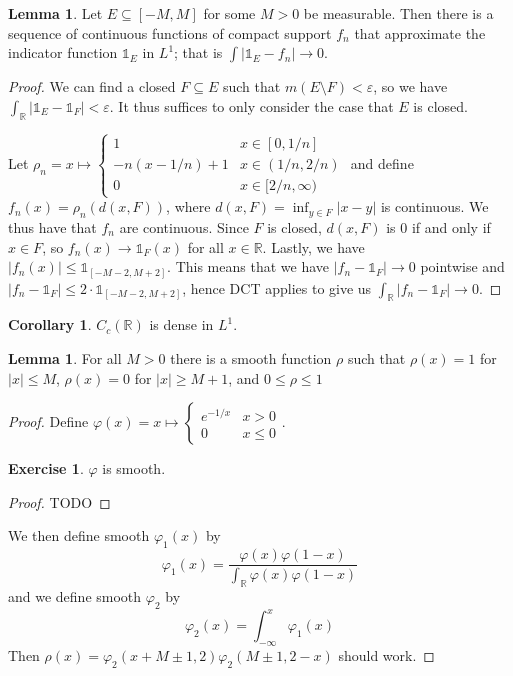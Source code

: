 \documentclass{article}
\newcommand{\R}{\mathbb{R}}
\theoremstyle{definition} %
\numberwithin{thm}{section} %
\newtheorem{lemma}[thm]{Lemma}
\newtheorem{cor}[thm]{Corollary}
\theoremstyle{definition} %
\newtheorem{exercise}[thm]{Exercise}
\begin{document}
\begin{lemma}
Let $E \subseteq [-M, M]$ for some $M > 0$ be measurable. Then there is a sequence of continuous functions of compact support $f_n$ that approximate the indicator function $\mathds{1}_E$ in $L^1$; that is $\int |\mathds{1}_E - f_n| \to 0$.
\end{lemma}

\begin{proof}
We can find a closed $F \subseteq E$ such that $m(E \setminus F) < \varepsilon$, so we have $\int_\R |\mathds{1}_E - \mathds{1}_F| < \varepsilon$. It thus suffices to only consider the case that $E$ is closed.

Let $\rho_n = x \mapsto \begin{cases}
    1 & x \in [0, 1/n] \\
    -n(x - 1/n) + 1 & x \in (1/n, 2/n) \\
    0 & x \in [2/n, \infty)
\end{cases}$ and define $f_n(x) = \rho_n(d(x, F))$, where $d(x, F) = \inf_{y \in F}|x - y|$ is continuous. We thus have that $f_n$ are continuous. Since $F$ is closed, $d(x, F)$ is 0 if and only if $x \in F$, so $f_n(x) \to \mathds{1}_F(x)$ for all $x \in \R$. Lastly, we have $|f_n(x)| \leq \mathds{1}_{[-M - 2, M + 2]}$. This means that we have $|f_n - \mathds{1}_F| \to 0$ pointwise and $|f_n - \mathds{1}_F| \leq 2 \cdot \mathds{1}_{[-M - 2, M + 2]}$, hence DCT applies to give us $\int_\R |f_n - \mathds{1}_F| \to 0$.
\end{proof}

\begin{cor}
$C_c(\R)$ is dense in $L^1$.
\end{cor}

\begin{lemma}
For all $M > 0$ there is a smooth function $\rho$ such that $\rho(x) = 1$ for $|x| \leq M$, $\rho(x) = 0$ for $|x| \geq M + 1$, and $0 \leq \rho \leq 1$
\end{lemma}
\begin{proof}
Define $\varphi(x) = x \mapsto \begin{cases}
    e^{-1/x} & x > 0 \\ 0 & x \leq 0
\end{cases}$.
\begin{exercise}
$\varphi$ is smooth.
\end{exercise}
\begin{proof}
    TODO
\end{proof}

We then define smooth $\varphi_1(x)$ by 
\[ \varphi_1(x) = \frac{\varphi(x)\varphi(1 - x)}{\int_\R \varphi(x)\varphi(1 - x)} \]
and we define smooth $\varphi_2$ by 
\[ \varphi_2(x) = \int_{-\infty}^x \varphi_1(x) \]
Then $\rho(x) = \varphi_2(x + M \pm 1, 2)\varphi_2(M \pm 1, 2 - x)$ should work.
\end{proof}
\end{document}

